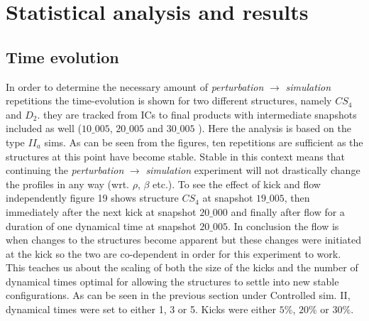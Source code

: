 \section{Statistical analysis and results}

\subsection{Time evolution}
In order to determine the necessary amount of \textit{perturbation} $\rightarrow$ \textit{simulation} repetitions the time-evolution is shown for two different structures, namely $CS_4$ and $D_2$. they are tracked from ICs to final products with intermediate snapshots included as well ($10\_005$, $20\_005$ and $30\_005$ ). Here the analysis is based on the type $II_a$ sims. As can be seen from the figures, ten repetitions are sufficient as the structures at this point have become stable. Stable in this context means that continuing the \textit{perturbation} $\rightarrow$ \textit{simulation} experiment will not drastically change the profiles in any way (wrt. $\rho$, $\beta$ etc.). To see the effect of kick and flow independently figure 19 shows structure $CS_4$ at snapshot $19\_005$, then immediately after the next kick at snapshot $20\_000$ and finally after flow for a duration of one dynamical time at snapshot $20\_005$. In conclusion the flow is when changes to the structures become apparent but these changes were initiated at the kick so the two are co-dependent in order for this experiment to work. This teaches us about the scaling of both the size of the kicks and the number of dynamical times optimal for allowing the structures to settle into new stable configurations. As can be seen in the previous section under 
Controlled sim. II, dynamical times were set to either 1, 3 or 5. Kicks were either $5\%$, $20\%$ or $30\%$.

